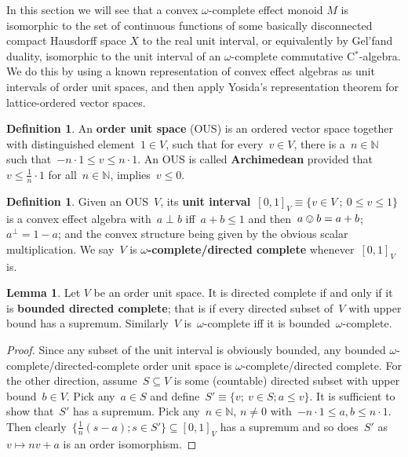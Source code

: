 \documentclass[10pt,conference]{IEEEtran}
\newcommand{\N}{\mathbb{N}}
\newcommand\Define[1]{\textbf{#1}}
\newcounter{counter}
\theoremstyle{definition}
\newtheorem{lemma}[counter]{Lemma}
\newtheorem{definition}[counter]{Definition}
\begin{document}
In this section we will see that a convex $\omega$-complete effect monoid $M$ is isomorphic to the set of continuous functions of some basically disconnected compact Hausdorff space $X$ to the real unit interval, or equivalently by Gel'fand duality, isomorphic to the unit interval of an $\omega$-complete commutative C$^*$-algebra. We do this by using a known representation of convex effect algebras as unit intervals of order unit spaces, and then apply Yosida's representation theorem for lattice-ordered vector spaces.


\begin{definition}
    An \Define{order unit space} (OUS)
        is an ordered vector space
            together with distinguished element~$1 \in V$,
            such that for every~$v \in V$,
            there is a~$n \in \N$
            such that~$ -n\cdot 1 \leq v \leq n \cdot 1$.
An OUS is called \Define{Archimedean} provided
    that~$v \leq \frac{1}{n}\cdot 1$
    for all~$n \in \N$,
    implies~$v \leq 0$.
\end{definition}

\begin{definition}
Given an OUS~$V$, its \Define{unit interval}~$
    [0,1]_V \equiv \{v\in V~;~ 0\leq v\leq 1\}$
    is a convex effect algebra
        with~$a \perp b$ iff~$a+b \leq 1$
        and then~$a \ovee b = a+b$;
        $a^\perp = 1-a$; and the convex structure being given by the obvious
        scalar multiplication.
    We say~$V$ is \Define{$\omega$-complete/directed complete}
        whenever~$[0,1]_V$ is.
\end{definition}

\begin{lemma}\label{lem:completenessousemod}
    Let $V$ be an order unit space. It is directed complete
    if and only if it is \Define{bounded directed complete};
    that is if every
    directed subset of~$V$ with upper bound
    has a supremum.
    Similarly~$V$ is~$\omega$-complete iff it is bounded~$\omega$-complete.
\end{lemma}
\begin{proof}
Since any subset of the unit interval is obviously bounded, any
    bounded $\omega$-complete/directed-complete order unit space
    is $\omega$-complete/directed complete.
For the other direction, assume~$S \subseteq V$
    is some (countable) directed subset with upper bound~$b \in V$.
    Pick any~$a \in S$ and define~$S' \equiv \{v;\ v \in S; a \leq v\}$.
    It is sufficient to show that~$S'$ has a supremum.
    Pick any~$n \in \N$, $n\neq 0$ with~$-n \cdot 1 \leq a,b  \leq n\cdot 1$.
Then clearly~$\{\frac{1}{n} (s-a); s\in S'\} \subseteq [0,1]_V$
    has a supremum and so does~$S'$ as~$v \mapsto nv + a$
    is an order isomorphism.
\end{proof}
\end{document}
